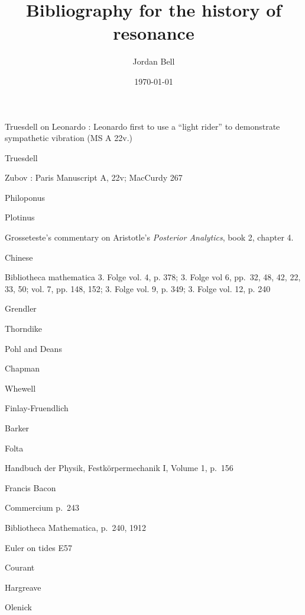 \documentclass{amsart}
\begin{document}
\title{Bibliography for the history of resonance}
\author{Jordan Bell}
\address{Department of Mathematics, University of Toronto, Toronto, Ontario, Canada}
\date{\today}

\maketitle

Truesdell on Leonardo \cite[pp.~18--20]{truesdell1968I}: Leonardo
first to use a ``light rider'' to demonstrate sympathetic vibration 
(MS A 22v.)

Truesdell \cite[p.~108]{truesdell1968II}

Zubov \cite[p.~88]{zubov}: Paris Manuscript A, 22v; MacCurdy 267

Philoponus \cite[pp.~46, 135]{lacey}

Plotinus \cite[p.~155]{sorabji}

Grosseteste's commentary on Aristotle's {\em Posterior Analytics}, book 2, chapter 4.

Chinese \cite[pp.~14,15,1814]{selin}

Bibliotheca mathematica 3. Folge vol. 4, p. 378; 3. Folge vol 6, pp.~32, 48, 42,
22, 33, 50; vol. 7, pp. 148, 152; 3. Folge vol. 9, p. 349; 3. Folge vol. 12,
p. 240

Grendler \cite[p.~11]{grendler}

Thorndike \cite[p.~600]{thorndike}

Pohl and Deans \cite[p.~259]{pohl}

Chapman \cite[Chapter 10]{chapman}

Whewell \cite[p.~297]{whewell}

Finlay-Fruendlich \cite[pp.~95, 117]{fruendlich}

Barker \cite[p.~116]{barker}

Folta \cite[p.~103]{folta}

Handbuch der Physik, Festk\"orpermechanik I, Volume 1, p.~156

Francis Bacon \cite[pp.~141--152]{bacon}

Commercium p.~243

Bibliotheca Mathematica, p.~240, 1912

Euler on tides E57 \cite[pp.~300--304]{E57}

Courant \cite[p.~514]{courant}

Hargreave \cite[p.~102]{hargreave}

Olenick \cite[p.~400]{olenick}
\end{document}
